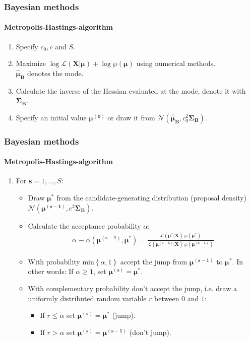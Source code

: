 \documentclass{beamer} %
\newcounter{saveenumi}
\newcommand{\seti}{\setcounter{saveenumi}{\value{enumi}}}
\newcommand{\conti}{\setcounter{enumi}{\value{saveenumi}}}
\begin{document}
\begin{frame}\frametitle{Bayesian methods}\framesubtitle{Metropolis-Hastings-algorithm}
\begin{enumerate}
\item Specify $c_0,c$ and $S$.
  \item Maximize $\log{\mathcal{L}(\mathbf{X}|\boldsymbol{\mu})} +
      \log{\wp(\boldsymbol{\mu})}$ using numerical methods.\\
      $\boldsymbol{\widehat{\mu}_B}$ denotes the mode.
  \item Calculate the inverse of the Hessian evaluated at the mode, denote it with $\boldsymbol{\Sigma_B}$.
  \item Specify an initial value $\boldsymbol{\mu^{(0)}}$ or draw it from
      $\mathcal{N}(\boldsymbol{\widehat{\mu}_B},c_0^2\boldsymbol{\Sigma_B})$.
\seti
\end{enumerate}

\end{frame}


\begin{frame}\frametitle{Bayesian methods}\framesubtitle{Metropolis-Hastings-algorithm}
\begin{enumerate}\conti
  \item For $\mathbf{s}=1,\dots,S$:
  \begin{itemize}
    \item Draw $\boldsymbol{\mu^*}$ from the candidate-generating distribution (proposal density)
        $\mathcal{N}(\boldsymbol{\mu^{(s-1)}},c^2\boldsymbol{\Sigma_B})$.
    \item Calculate the acceptance probability $\alpha$:
        \begin{align*}
        \alpha \equiv \alpha\left(\boldsymbol{\mu^{(s-1)}},\boldsymbol{\mu^*}\right) = \frac{\mathcal{L}\left(\boldsymbol{\mu^{*}}|\mathbf{X}\right)~\wp\left(\boldsymbol{\mu^*}\right)}{\mathcal{L}\left(\boldsymbol{\mu^{(s-1)}}|\mathbf{X}\right)~\wp\left(\boldsymbol{\mu^{(s-1)}}\right)}
        \end{align*}
    \item With probability
        $\text{min}\left\{\alpha,1\right\}$ accept the jump from $\boldsymbol{\mu^{(s-1)}}$ to $\boldsymbol{\mu^*}$.
        In other words: If $\alpha\geq1$, set $\boldsymbol{\mu^{(s)}}=\boldsymbol{\mu^*}$.
    \item With complementary probability don't accept the jump, i.e. draw a uniformly distributed random variable $r$ between $0$ and $1$:
        \begin{itemize}
        \item If $r\leq\alpha$ set $\boldsymbol{\mu^{(s)}}=\boldsymbol{\mu^*}$ (jump).
        \item If $r>\alpha$ set $\boldsymbol{\mu^{(s)}}=\boldsymbol{\mu^{(s-1)}}$ (don't jump).
         \end{itemize}
  \end{itemize}
\seti
\end{enumerate}

\end{frame}
\end{document}
